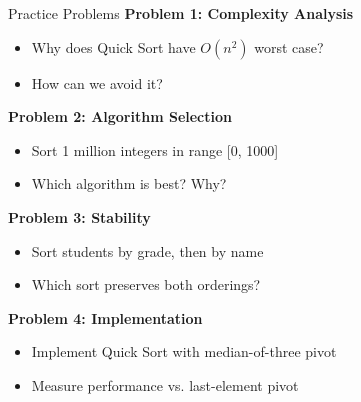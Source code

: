 \documentclass[aspectratio=169]{beamer}
\begin{document}
\begin{frame}{Practice Problems}
  \textbf{Problem 1: Complexity Analysis}
  \begin{itemize}
    \item Why does Quick Sort have $O(n^2)$ worst case?
    \item How can we avoid it?
  \end{itemize}

  \vspace{0.2cm}
  \textbf{Problem 2: Algorithm Selection}
  \begin{itemize}
    \item Sort 1 million integers in range [0, 1000]
    \item Which algorithm is best? Why?
  \end{itemize}

  \vspace{0.2cm}
  \textbf{Problem 3: Stability}
  \begin{itemize}
    \item Sort students by grade, then by name
    \item Which sort preserves both orderings?
  \end{itemize}

  \vspace{0.2cm}
  \textbf{Problem 4: Implementation}
  \begin{itemize}
    \item Implement Quick Sort with median-of-three pivot
    \item Measure performance vs. last-element pivot
  \end{itemize}
\end{frame}
\end{document}
